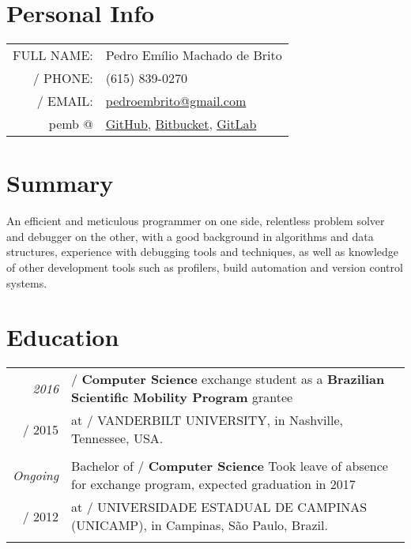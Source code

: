 \documentclass[a4paper,10pt]{article}
\makeatletter
\def\fakesc#1{%
  \begingroup%
  \xdef\fake@name{\csname\curr@fontshape/\f@size\endcsname}%
  \fontsize{\fontdimen8\fake@name}{\baselineskip}\selectfont%
  \uppercase{#1}%
  \endgroup%
}
\renewcommand{\textsc}{\fakesc}
\makeatother
\begin{document}
\pagestyle{empty} %

\par{\bigskip\par}

\section{Personal Info}

\begin{tabularx}{\textwidth}{ rl}
  \textsc{Full name:} & Pedro Emílio Machado de Brito \\
  \textsc{Phone:} & (615) 839-0270 \\
  \textsc{Email:} & \href{mailto:pedroembrito@gmail.com}{pedroembrito@gmail.com}\\
  \footnotesize{pemb @} & \href{https://github.com/pemb/}{GitHub}, \href{https://bitbucket.org/pemb}{Bitbucket}, \href{https://gitlab.com/pemb}{GitLab}\\
\end{tabularx}

\section{Summary}

An efficient and meticulous programmer on one side, relentless problem solver and debugger on the other, with a good background in algorithms and data structures, experience with debugging tools and techniques, as well as knowledge of other development tools such as profilers, build automation and version control systems.


\section{Education}

\begin{tabularx}{\textwidth}{r|X}	

  \emph{2016} & \textsc{}\textbf{Computer Science} exchange student as a \textbf{Brazilian Scientific Mobility Program} grantee  \\
  \textsc{2015} & at \textsc{Vanderbilt University,} \footnotesize{in Nashville, Tennessee, USA.}\\
  \multicolumn{2}{c}{}\\

  \emph{Ongoing} & Bachelor of \textsc{}\textbf{Computer Science} {\tiny Took leave of absence for exchange program, expected graduation in 2017} \\
  \textsc{2012} & at \textsc{Universidade Estadual de Campinas (Unicamp),} \footnotesize{in Campinas, São Paulo, Brazil.}\\
  \multicolumn{2}{c}{}\\

\end{tabularx}
\end{document}
